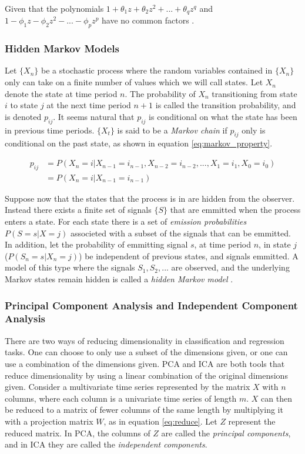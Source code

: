 Given that the polynomials $1 + \theta_1 z + \theta_2 z^2 + ... + \theta_q z^q$ and $1 - \phi_1 z - \phi_2 z^2 - ... - \phi_p z^p$ have no common factors \cite{brockwell_davis}.

\subsubsection*{Hidden Markov Models} \label{s:hmm}
Let $\{X_n\}$ be a stochastic process where the random variables contained in $\{X_n\}$ only can take on a finite number of values which we will call states. 
Let $X_n$ denote the state at time period $n$. 
The probability of $X_n$ transitioning from state $i$ to state $j$ at the next time period $n+1$ is called the transition probability, and is denoted $p_{ij}$. 
It seems natural that $p_{ij}$ is conditional on what the state has been in previous time periods. 
$\{X_t\}$ is said to be a \textit{Markov chain} if $p_{ij}$ only is conditional on the past state, as shown in equation \eqref{eq:markov_property}.

\begin{equation}
    \begin{split}
        p_{ij}  &= P(X_n = i | X_{n-1} = i_{n-1}, X_{n-2} = i_{n-2},..., X_{1} = i_{1}, X_{0} = i_{0}) \\
                &= P(X_n = i | X_{n-1} = i_{n-1})      
    \end{split}
    \label{eq:markov_property}
\end{equation}

Suppose now that the states that the process is in are hidden from the observer. 
Instead there exists a finite set of signals $\{S\}$ that are emmitted when the process enters a state. 
For each state there is a set of \textit{emission probabilities} $P(S = s | X = j)$ associeted with a subset of the signals that can be emmitted.
In addition, let the probability of emmitting signal $s$, at time period $n$, in state $j$ ($P(S_n = s | X_n = j)$) be independent of previous states, and signals emmitted. 
A model of this type where the signals $S_1, S_2, ...$ are observed, and the underlying Markov states remain hidden is called a \textit{hidden Markov model} \cite{stoch_pros}. 

\subsubsection*{Principal Component Analysis and Independent Component Analysis}
There are two ways of reducing dimensionality in classification and regression tasks. 
One can choose to only use a subset of the dimensions given, or one can use a combination of the dimensions given.
PCA and ICA are both tools that reduce dimensionality by using a linear combination of the original dimensions given.
Consider a multivariate time series represented by the matrix $X$ with $n$ columns, where each column is a univariate time series of length $m$.
$X$ can then be reduced to a matrix of fewer columns of the same length by multiplying it with a projection matrix $W$, as in equation \ref{eq:reduce}. 
Let $Z$ represent the reduced matrix.
In PCA, the columns of $Z$ are called the \textit{principal components}, and in ICA they are called the \textit{independent components}. 

